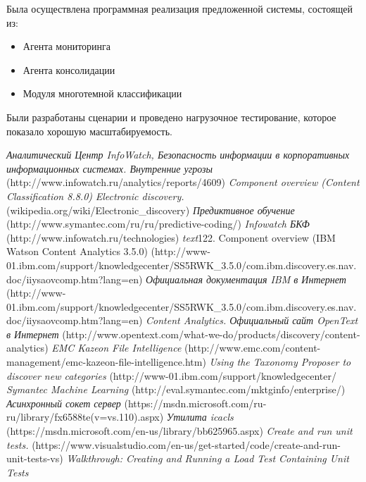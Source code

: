 \documentclass[russian, utf8, emptystyle]{eskdtext}
\begin{document}
Была осуществлена программная реализация предложенной системы, состоящей из:
\begin{itemize}
	\item Агента мониторинга
	\item Агента консолидации
	\item Модуля многотемной классификации
\end{itemize}

Были разработаны сценарии и проведено нагрузочное тестирование, которое показало хорошую масштабируемость.

\begin{thebibliography}{50}
	\textit {Аналитический Центр InfoWatch, Безопасность информации в корпоративных информационных системах. Внутренние угрозы}
	{(http://www.infowatch.ru/analytics/reports/4609)}
	\textit {Component overview (Content Classification 8.8.0)}
	\textit{Electronic discovery.}
	{(wikipedia.org/wiki/Electronic\_discovery)}
	\textit {Предиктивное обучение}
	{(http://www.symantec.com/ru/ru/predictive-coding/)}
	\textit {Infowatch БКФ }
	{(http://www.infowatch.ru/technologies)}
	\textit{text}{122.	Component overview (IBM Watson Content Analytics 3.5.0)}
	{(http://www-01.ibm.com/support/knowledgecenter/SS5RWK\_3.5.0/com.ibm.discovery.es.nav.doc/iiysaovcomp.htm?lang=en)}
	\textit{Официальная документация IBM в Интернет}
	{(http://www-01.ibm.com/support/knowledgecenter/SS5RWK\_3.5.0/com.ibm.discovery.es.nav.doc/iiysaovcomp.htm?lang=en)}
	\textit{Content Analytics. Официальный сайт OpenText в Интернет}
	{(http://www.opentext.com/what-we-do/products/discovery/content-analytics)}
	\textit{EMC Kazeon File Intelligence}
	{(http://www.emc.com/content-management/emc-kazeon-file-intelligence.htm)}
	\textit{Using the Taxonomy Proposer to discover new categories}
	{(http://www-01.ibm.com/support/knowledgecenter/}
	\textit {Symantec Machine Learning}
	{(http://eval.symantec.com/mktginfo/enterprise/)}
	\textit{Асинхронный сокет сервер}
	{(https://msdn.microsoft.com/ru-ru/library/fx6588te(v=vs.110).aspx)}
	\textit{Утилита icacls}
	{(https://msdn.microsoft.com/en-us/library/bb625965.aspx)}
	\textit{Create and run unit tests.}
	{(https://www.visualstudio.com/en-us/get-started/code/create-and-run-unit-tests-vs)}
	\textit{Walkthrough: Creating and Running a Load Test Containing Unit Tests}

\end{thebibliography}
\end{document}
